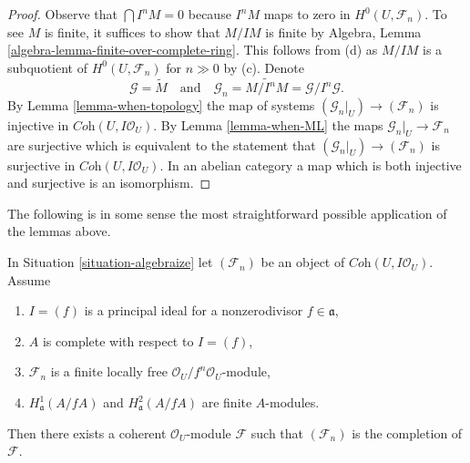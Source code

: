 \begin{proof}
Observe that $\bigcap I^nM = 0$ because $I^nM$ maps to zero
in $H^0(U, \mathcal{F}_n)$. To see $M$ is finite, it suffices to show that
$M/IM$ is finite by
Algebra, Lemma \ref{algebra-lemma-finite-over-complete-ring}.
This follows from (d) as $M/IM$ is a subquotient of $H^0(U, \mathcal{F}_n)$
for $n \gg 0$ by (c). Denote
$$
\mathcal{G} = \widetilde{M}
\quad\text{and}\quad
\mathcal{G}_n = \widetilde{M/I^nM} = \mathcal{G}/I^n\mathcal{G}.
$$
By Lemma \ref{lemma-when-topology} the map of systems
$(\mathcal{G}_n|_U) \to (\mathcal{F}_n)$ is injective in
$\textit{Coh}(U, I\mathcal{O}_U)$.
By Lemma \ref{lemma-when-ML} the maps $\mathcal{G}_n|_U \to \mathcal{F}_n$
are surjective which is equivalent to the statement that
$(\mathcal{G}_n|_U) \to (\mathcal{F}_n)$ is surjective in
$\textit{Coh}(U, I\mathcal{O}_U)$. In an abelian category
a map which is both injective and surjective is an isomorphism.
\end{proof}

\noindent
The following is in some sense the most straightforward possible application
of the lemmas above.

\begin{lemma}
\label{lemma-algebraization-principal-variant}
In Situation \ref{situation-algebraize} let
$(\mathcal{F}_n)$ be an object of $\textit{Coh}(U, I\mathcal{O}_U)$.
Assume
\begin{enumerate}
\item $I = (f)$ is a principal ideal for a nonzerodivisor $f \in \mathfrak a$,
\item $A$ is complete with respect to $I = (f)$,
\item $\mathcal{F}_n$ is a finite locally free
$\mathcal{O}_U/f^n\mathcal{O}_U$-module,
\item $H^1_\mathfrak a(A/fA)$ and $H^2_\mathfrak a(A/fA)$
are finite $A$-modules.
\end{enumerate}
Then there exists a coherent $\mathcal{O}_U$-module
$\mathcal{F}$ such that $(\mathcal{F}_n)$ is the completion of $\mathcal{F}$.
\end{lemma}

